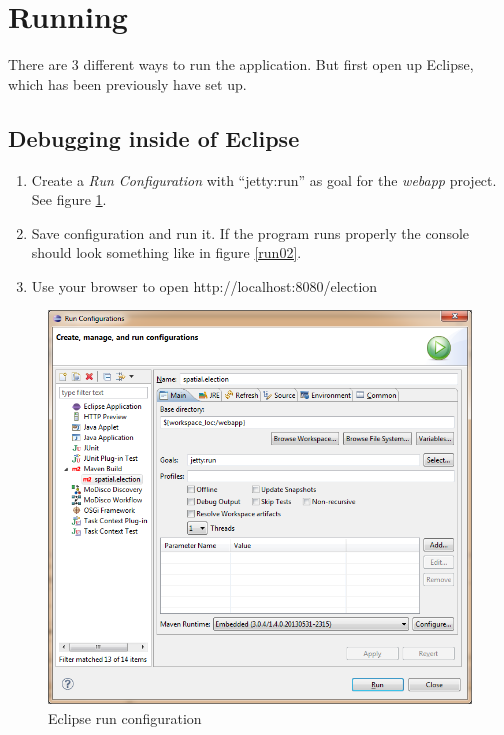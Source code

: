 
\section{Running}


There are 3 different ways to run the application. But first open up
Eclipse, which has been previously have set
up.

\subsection{Debugging inside of
Eclipse}\label{debugging-inside-of-eclipse}

\begin{enumerate}
\def\labelenumi{\arabic{enumi}.}
\item
  Create a \emph{Run Configuration} with ``jetty:run'' as goal for the
  \emph{webapp} project. See figure \ref{run01}.
  
\item
  Save configuration and run it. If the program runs properly the
  console should look something like in figure \ref{run02}.
\item
  Use your browser to open http://localhost:8080/election
\end{enumerate}

\begin{figure}[htbp]
\centering
  \includegraphics[width=1.1\textwidth]{../img/dwACYmd.png}
\caption{Eclipse run configuration}
\label{run01}
\end{figure}

